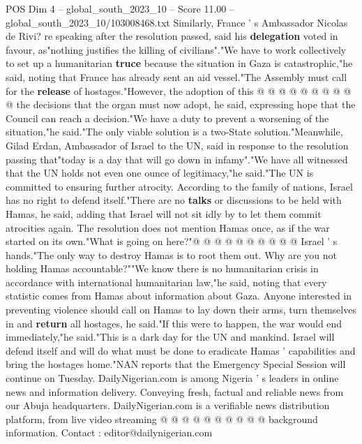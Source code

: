 \begin{textsample}{POS Dim 4 – global\_south\_2023\_10 – Score 11.00 – global\_south\_2023\_10/103008468.txt}
Similarly, France ' s Ambassador Nicolas de Rivi? re speaking after the resolution passed, said his \textbf{delegation} voted in favour, as"nothing justifies the killing of civilians"."We have to work collectively to set up a humanitarian \textbf{truce} because the situation in Gaza is catastrophic,"he said, noting that France has already sent an aid vessel."The Assembly must call for the \textbf{release} of hostages."However, the adoption of this @ @ @ @ @ @ @ @ @ @ the decisions that the organ must now adopt, he said, expressing hope that the Council can reach a decision."We have a duty to prevent a worsening of the situation,"he said."The only viable solution is a two-State solution."Meanwhile, Gilad Erdan, Ambassador of Israel to the UN, said in response to the resolution passing that"today is a day that will go down in infamy"."We have all witnessed that the UN holds not even one ounce of legitimacy,"he said."The UN is committed to ensuring further atrocity.
According to the family of nations, Israel has no right to defend itself."There are no \textbf{talks} or discussions to be held with Hamas, he said, adding that Israel will not sit idly by to let them commit atrocities again.
The resolution does not mention Hamas once, as if the war started on its own."What is going on here?"@ @ @ @ @ @ @ @ @ @ Israel ' s hands."The only way to destroy Hamas is to root them out.
Why are you not holding Hamas accountable?""We know there is no humanitarian crisis in accordance with international humanitarian law,"he said, noting that every statistic comes from Hamas about information about Gaza.
Anyone interested in preventing violence should call on Hamas to lay down their arms, turn themselves in and \textbf{return} all hostages, he said."If this were to happen, the war would end immediately,"he said."This is a dark day for the UN and mankind.
Israel will defend itself and will do what must be done to eradicate Hamas ' capabilities and bring the hostages home."NAN reports that the Emergency Special Session will continue on Tuesday.
DailyNigerian.com is among Nigeria ' s leaders in online news and information delivery.
Conveying fresh, factual and reliable news from our Abuja headquarters.
DailyNigerian.com is a verifiable news distribution platform, from live video streaming @ @ @ @ @ @ @ @ @ @ background information.
Contact : editor@dailynigerian.com

\end{textsample}
